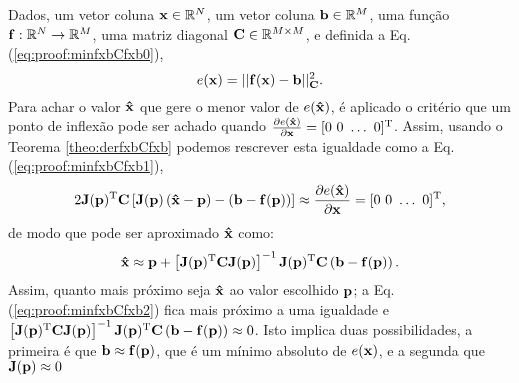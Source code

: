 \begin{myproofT}\label{proof:theo:minfxbCfxb}
Dados,
um vetor coluna $\VECTOR{x}\in \mathbb{R}^N$, 
um vetor coluna $\VECTOR{b}\in \mathbb{R}^M$,  
uma função $\VECTOR{f}:\mathbb{R}^{N} \rightarrow \mathbb{R}^{M}$, 
uma matriz diagonal $\MATRIX{C} \in \mathbb{R}^{M\times M}$, e 
definida a Eq. (\ref{eq:proof:minfxbCfxb0}),
\begin{equation}\label{eq:proof:minfxbCfxb0}
e(\VECTOR{x})=||\VECTOR{f}(\VECTOR{x})-\VECTOR{b}||_{\MATRIX{C}}^2.
\end{equation}
Para achar o valor  $\VECTOR{\hat{x}}$ que gere o menor valor de $e(\VECTOR{\hat{x}})$, é aplicado
o critério que um ponto de inflexão pode ser achado quando 
$\frac{\partial e(\VECTOR{\hat{x}})}{\partial \VECTOR{x} }=[0~ 0~ \hdots~ 0 ]^{\transpose}$.
Assim, usando o Teorema \ref{theo:derfxbCfxb} podemos 
rescrever esta igualdade como a Eq. (\ref{eq:proof:minfxbCfxb1}),
\begin{equation}\label{eq:proof:minfxbCfxb1}
2 \MATRIX{J}(\VECTOR{p})^{\transpose}\MATRIX{C}\left[\MATRIX{J}(\VECTOR{p})\left(\VECTOR{\hat{x}} - \VECTOR{p}\right)-\left(\VECTOR{b}-\VECTOR{f}(\VECTOR{p})\right)\right] \approx
\frac{\partial e(\VECTOR{\hat{x}})}{\partial \VECTOR{x} }=[0~ 0~ \hdots~ 0 ]^{\transpose},
\end{equation}
de modo que pode ser aproximado $\VECTOR{\hat{x}}$ como:
\begin{equation}\label{eq:proof:minfxbCfxb2}
\VECTOR{\hat{x}} \approx \VECTOR{p} +
\left[ \MATRIX{J}(\VECTOR{p})^{\transpose}\MATRIX{C} \MATRIX{J}(\VECTOR{p}) \right]^{-1}
\MATRIX{J}(\VECTOR{p})^{\transpose}\MATRIX{C} \left(\VECTOR{b}-\VECTOR{f}(\VECTOR{p})\right).
\end{equation}
Assim, quanto mais próximo seja $\VECTOR{\hat{x}}$ ao valor escolhido $\VECTOR{p}$;
a Eq. (\ref{eq:proof:minfxbCfxb2}) fica mais próximo a uma igualdade e
$\left[ \MATRIX{J}(\VECTOR{p})^{\transpose}\MATRIX{C} \MATRIX{J}(\VECTOR{p}) \right]^{-1} \MATRIX{J}(\VECTOR{p})^{\transpose}\MATRIX{C} \left(\VECTOR{b}-\VECTOR{f}(\VECTOR{p})\right) \approx 0$. 
Isto implica duas possibilidades, a primeira é que $\VECTOR{b} \approx \VECTOR{f}(\VECTOR{p})$,
que é um mínimo absoluto de $e(\VECTOR{x})$,
e a segunda que $\MATRIX{J}(\VECTOR{p}) \approx 0$


\end{myproofT}
